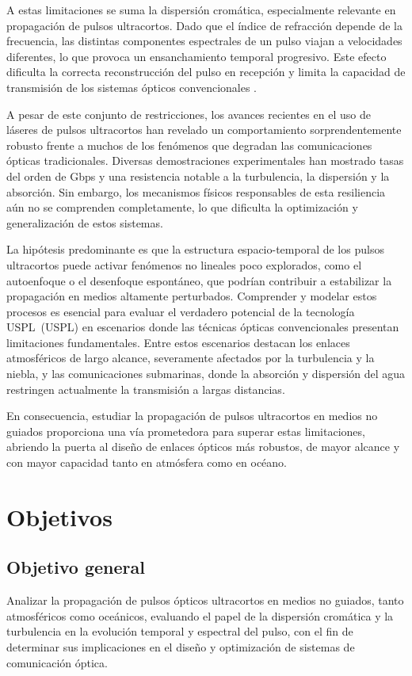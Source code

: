 A estas limitaciones se suma la dispersión cromática, especialmente relevante en propagación de pulsos ultracortos. Dado que el índice de refracción depende de la frecuencia, las distintas componentes espectrales de un pulso viajan a velocidades diferentes, lo que provoca un ensanchamiento temporal progresivo. Este efecto dificulta la correcta reconstrucción del pulso en recepción y limita la capacidad de transmisión de los sistemas ópticos convencionales \cite{Agrawal}.

A pesar de este conjunto de restricciones, los avances recientes en el uso de láseres de pulsos ultracortos han revelado un comportamiento sorprendentemente robusto frente a muchos de los fenómenos que degradan las comunicaciones ópticas tradicionales. Diversas demostraciones experimentales han mostrado tasas del orden de Gbps y una resistencia notable a la turbulencia, la dispersión y la absorción. Sin embargo, los mecanismos físicos responsables de esta resiliencia aún no se comprenden completamente, lo que dificulta la optimización y generalización de estos sistemas.

La hipótesis predominante es que la estructura espacio-temporal de los pulsos ultracortos puede activar fenómenos no lineales poco explorados, como el autoenfoque o el desenfoque espontáneo, que podrían contribuir a estabilizar la propagación en medios altamente perturbados. Comprender y modelar estos procesos es esencial para evaluar el verdadero potencial de la tecnología \acs{USPL}~(\acl{USPL}) en escenarios donde las técnicas ópticas convencionales presentan limitaciones fundamentales. Entre estos escenarios destacan los enlaces atmosféricos de largo alcance, severamente afectados por la turbulencia y la niebla, y las comunicaciones submarinas, donde la absorción y dispersión del agua restringen actualmente la transmisión a largas distancias.

En consecuencia, estudiar la propagación de pulsos ultracortos en medios no guiados proporciona una vía prometedora para superar estas limitaciones, abriendo la puerta al diseño de enlaces ópticos más robustos, de mayor alcance y con mayor capacidad tanto en atmósfera como en océano.

\section{Objetivos}
\subsection*{Objetivo general}
Analizar la propagación de pulsos ópticos ultracortos en medios no guiados, tanto atmosféricos como oceánicos, evaluando el papel de la dispersión cromática y la turbulencia en la evolución temporal y espectral del pulso, con el fin de determinar sus implicaciones en el diseño y optimización de sistemas de comunicación óptica.

